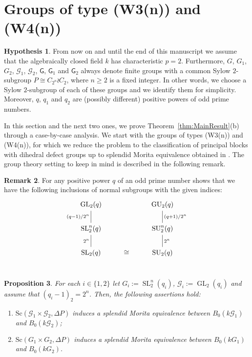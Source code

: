 \documentclass[12pt,a4paper]{amsart}
\theoremstyle{plain}\newtheorem{Theorem}{Theorem}[section]
\theoremstyle{plain}\newtheorem{Conjecture}[Theorem]{Conjecture}
\theoremstyle{plain}\newtheorem{Corollary}[Theorem]{Corollary}
\theoremstyle{plain}\newtheorem{Lemma}[Theorem]{Lemma}
\theoremstyle{plain}\newtheorem{Proposition}[Theorem]{Proposition}
\theoremstyle{definition}\newtheorem{Definition}[Theorem]{Definition}
\theoremstyle{definition}\newtheorem{Example}[Theorem]{Example}
\theoremstyle{definition}\newtheorem{Examples}[Theorem]{Examples}
\theoremstyle{definition}\newtheorem{Remark}[Theorem]{Remark}
\theoremstyle{definition}\newtheorem{Question}[Theorem]{Question}
\theoremstyle{definition}\newtheorem{Notation}[Theorem]{Notation}
\theoremstyle{definition}\newtheorem{Hypothesis}[Theorem]{Hypothesis}
\theoremstyle{definition}\newtheorem{Assumption}[Theorem]{Assumption}
\theoremstyle{definition}\newtheorem{Strategy}[Theorem]{Strategy}
\theoremstyle{definition}\newtheorem{Contents}[Theorem]{Contents}
\theoremstyle{definition}\newtheorem{Computations}[Theorem]{Computations}
\theoremstyle{definition}\newtheorem{Equivalences}[Theorem]{Equivalences}
\theoremstyle{definition}\newtheorem{Notation/Definition}[Theorem]{Notation/Definition}
\theoremstyle{definition}\newtheorem{noth}[Theorem]{}
\theoremstyle{plain}\newtheorem{Step}[Theorem]{Step}
\newcommand{\SL}{\operatorname{SL}}
\newcommand{\GL}{\operatorname{GL}}
\newcommand{\SU}{\operatorname{SU}}
\newcommand{\GU}{\operatorname{GU}}
\begin{document}
\section{Groups of type {\sf (W3(n))} and {\sf (W4(n))}}
\label{sec:W3W4}

\begin{Hypothesis}\label{Ass:p=2}%
From now on and until the end of this manuscript we assume that
the algebraically closed field $k$ has characteristic $p=2$. 
Furthermore, $G$, $G_{1}$, $G_{2}$, $\mathcal{G}_{1}$, $\mathcal{G}_{2}$, $\mathsf{G}$, $\mathsf{G}_{1}$ and $\mathsf{G}_{2}$ always denote finite groups 
with a common Sylow $2$-subgroup $P\cong C_{2^n}\wr C_2$, 
where $n\geq 2$ is a fixed integer. In other words, we choose a Sylow $2$-subgroup of each of these groups and we identify them for simplicity. 
Moreover,  $q$, $q_{1}$ and $q_{2}$ are (possibly different) positive powers of odd prime numbers.
\end{Hypothesis}



In this section and the next two ones, we prove Theorem~\ref{thm:MainResult}(b) 
through a case-by-case analysis. 
We start with the groups of types {\sf (W3(n))} and {\sf (W4(n))}, 
for which we reduce the problem to the classification of principal blocks 
with dihedral defect groups up to splendid Morita equivalence obtained in 
\cite[Theorem~1.1]{KL20a}.  
The group theory setting to keep in mind is described in the following remark. 



\begin{Remark}\label{GL-GU}%
For any positive power $q$ of an odd prime number \cite[p.4]{ABG70} shows that we have the 
following inclusions of normal subgroups with the given indices:
\[
\begin{tikzcd}
   \GL_2(q) \ar[d, dash, "(q-1)/2^n"']  & &   \GU_2(q) \ar[d, dash, "(q+1)/2^n"]   \\
 \SL_2^n(q) \ar[d, dash, "2^{n}"']   &   &   \SU_2^n(q)  \ar[d, dash, "2^{n}"]   \\
  \SL_2(q)   &  \cong   &   \SU_2(q) \\
\end{tikzcd}
\]
\end{Remark}


\begin{Proposition}\label{pro:SL2^m} 
For each $i\in\{1,2\}$ let $G_i:=\SL^n_2(q_i)$, 
$\mathcal G_i:=\GL_2(q_i)$ and assume that {$(q_i-1)_2=2^n$}.
Then, the following assertions hold:
\begin{enumerate}[label={\rm(\alph*)}, leftmargin=10mm] 
\item   
${\mathrm{Sc}}(\mathcal{G}_1\times\mathcal{G}_2, \Delta P)$ induces 
a splendid Morita equivalence between $B_0(k\mathcal G_1)$ and $B_0(k\mathcal G_2)$;
\item
 ${\mathrm{Sc}}(G_1\times G_2, \Delta P)$\! 
induces a splendid Morita equivalence between $B_0(kG_1)$\! and $B_0(kG_2)$.
\end{enumerate}
\end{Proposition} 
\end{document}
